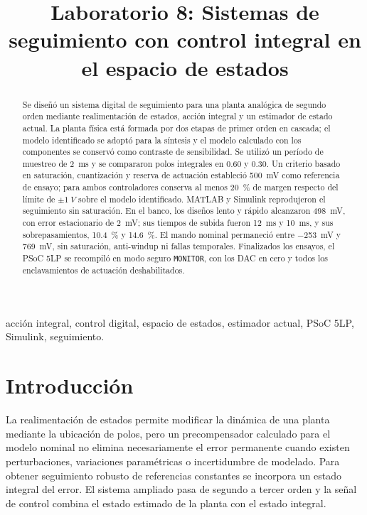 \documentclass[conference]{IEEEtran}
\title{Laboratorio 8: Sistemas de seguimiento con control integral en el espacio de estados}
\author{\IEEEauthorblockN{Aldo Pastore}
\IEEEauthorblockA{Carrera de Ingeniería Electrónica\\
Facultad de Ciencias y Tecnologías\\
Universidad Católica ``Nuestra Señora de la Asunción''\\
Asunción, Paraguay}}
\begin{document}
\maketitle

\begin{abstract}
Se diseñó un sistema digital de seguimiento para una planta analógica de segundo orden mediante realimentación de estados, acción integral y un estimador de estado actual. La planta física está formada por dos etapas de primer orden en cascada; el modelo identificado se adoptó para la síntesis y el modelo calculado con los componentes se conservó como contraste de sensibilidad. Se utilizó un período de muestreo de \SI{2}{ms} y se compararon polos integrales en $0.60$ y $0.30$. Un criterio basado en saturación, cuantización y reserva de actuación estableció \SI{500}{mV} como referencia de ensayo; para ambos controladores conserva al menos \SI{20}{\percent} de margen respecto del límite de $\pm\SI{1}{V}$ sobre el modelo identificado. MATLAB y Simulink reprodujeron el seguimiento sin saturación. En el banco, los diseños lento y rápido alcanzaron \SI{498}{mV}, con error estacionario de \SI{2}{mV}; sus tiempos de subida fueron \SI{12}{ms} y \SI{10}{ms}, y sus sobrepasamientos, \SI{10.4}{\percent} y \SI{14.6}{\percent}. El mando nominal permaneció entre \SI{-253}{mV} y \SI{769}{mV}, sin saturación, anti-windup ni fallas temporales. Finalizados los ensayos, el PSoC 5LP se recompiló en modo seguro \texttt{MONITOR}, con los DAC en cero y todos los enclavamientos de actuación deshabilitados.
\end{abstract}

\begin{IEEEkeywords}
acción integral, control digital, espacio de estados, estimador actual, PSoC 5LP, Simulink, seguimiento.
\end{IEEEkeywords}

\section{Introducción}
La realimentación de estados permite modificar la dinámica de una planta mediante la ubicación de polos, pero un precompensador calculado para el modelo nominal no elimina necesariamente el error permanente cuando existen perturbaciones, variaciones paramétricas o incertidumbre de modelado. Para obtener seguimiento robusto de referencias constantes se incorpora un estado integral del error. El sistema ampliado pasa de segundo a tercer orden y la señal de control combina el estado estimado de la planta con el estado integral.
\end{document}
